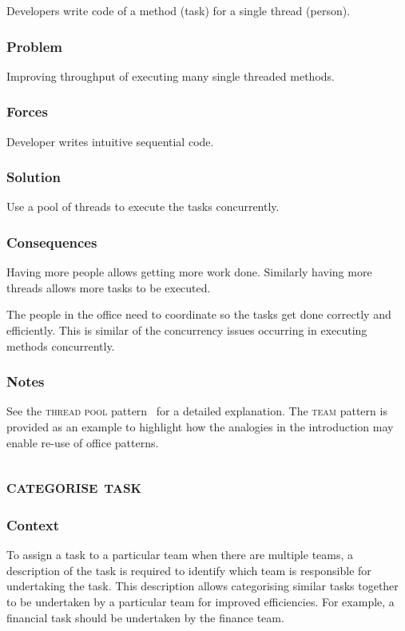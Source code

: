 \documentclass[prodmode]{style/acmlarge}
\begin{document}
Developers write code of a method (task) for a single thread (person).

\subsubsection*{Problem} Improving throughput of executing many single threaded methods.

\subsubsection*{Forces} Developer writes intuitive sequential code.

\subsubsection*{Solution} Use a pool of threads to execute the tasks
concurrently.

\subsubsection*{Consequences} Having more people allows getting more work done.
Similarly having more threads allows more tasks to be executed.

The people in the office need to coordinate so the tasks get done correctly and
efficiently.  This is similar of the concurrency issues occurring in executing
methods concurrently.

\subsubsection*{Notes} See the \textsc{thread pool}
pattern~\cite{thread-per-request} for a detailed explanation.  The \textsc{team}
pattern is provided as an example to highlight how the analogies in the
introduction may enable re-use of office patterns.



\subsection{\textsc{\textbf{categorise task}}}

\subsubsection*{Context} To assign a task to a particular team when there are multiple teams, a
description of the task is required to identify which team is responsible for
undertaking the task.  This description allows categorising similar tasks
together to be undertaken by a particular team for improved efficiencies.  For
example, a financial task should be undertaken by the finance team.
\end{document}
